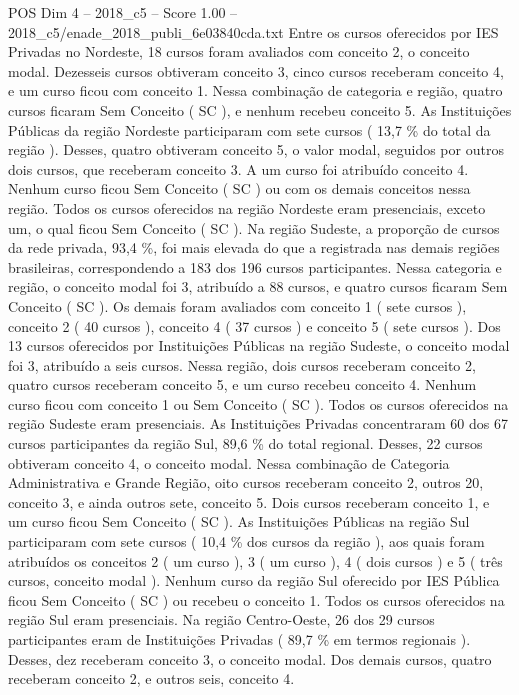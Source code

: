 \begin{textsample}{POS Dim 4 – 2018\_c5 – Score 1.00 – 2018\_c5/enade\_2018\_publi\_6e03840cda.txt}
Entre os cursos oferecidos por IES Privadas no Nordeste, 18 cursos foram avaliados com conceito 2, o conceito modal.
Dezesseis cursos obtiveram conceito 3, cinco cursos receberam conceito 4, e um curso ficou com conceito 1.
Nessa combinação de categoria e região, quatro cursos ficaram Sem Conceito ( SC ), e nenhum recebeu conceito 5.
As Instituições Públicas da região Nordeste participaram com sete cursos ( 13,7 \% do total da região ).
Desses, quatro obtiveram conceito 5, o valor modal, seguidos por outros dois cursos, que receberam conceito 3.
A um curso foi atribuído conceito 4.
Nenhum curso ficou Sem Conceito ( SC ) ou com os demais conceitos nessa região.
Todos os cursos oferecidos na região Nordeste eram presenciais, exceto um, o qual ficou Sem Conceito ( SC ).
Na região Sudeste, a proporção de cursos da rede privada, 93,4 \%, foi mais elevada do que a registrada nas demais regiões brasileiras, correspondendo a 183 dos 196 cursos participantes.
Nessa categoria e região, o conceito modal foi 3, atribuído a 88 cursos, e quatro cursos ficaram Sem Conceito ( SC ).
Os demais foram avaliados com conceito 1 ( sete cursos ), conceito 2 ( 40 cursos ), conceito 4 ( 37 cursos ) e conceito 5 ( sete cursos ).
Dos 13 cursos oferecidos por Instituições Públicas na região Sudeste, o conceito modal foi 3, atribuído a seis cursos.
Nessa região, dois cursos receberam conceito 2, quatro cursos receberam conceito 5, e um curso recebeu conceito 4.
Nenhum curso ficou com conceito 1 ou Sem Conceito ( SC ).
Todos os cursos oferecidos na região Sudeste eram presenciais.
As Instituições Privadas concentraram 60 dos 67 cursos participantes da região Sul, 89,6 \% do total regional.
Desses, 22 cursos obtiveram conceito 4, o conceito modal.
Nessa combinação de Categoria Administrativa e Grande Região, oito cursos receberam conceito 2, outros 20, conceito 3, e ainda outros sete, conceito 5.
Dois cursos receberam conceito 1, e um curso ficou Sem Conceito ( SC ).
As Instituições Públicas na região Sul participaram com sete cursos ( 10,4 \% dos cursos da região ), aos quais foram atribuídos os conceitos 2 ( um curso ), 3 ( um curso ), 4 ( dois cursos ) e 5 ( três cursos, conceito modal ).
Nenhum curso da região Sul oferecido por IES Pública ficou Sem Conceito ( SC ) ou recebeu o conceito 1.
Todos os cursos oferecidos na região Sul eram presenciais.
Na região Centro-Oeste, 26 dos 29 cursos participantes eram de Instituições Privadas ( 89,7 \% em termos regionais ).
Desses, dez receberam conceito 3, o conceito modal.
Dos demais cursos, quatro receberam conceito 2, e outros seis, conceito 4.

\end{textsample}
